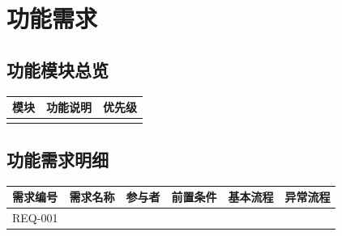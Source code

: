 \section{功能需求}

\subsection{功能模块总览}

\begin{longtable}{|p{36mm}|p{88mm}|p{24mm}|}
\hline
\textbf{模块} & \textbf{功能说明} & \textbf{优先级} \\
\hline
 &  &  \\
\hline
\end{longtable}

\subsection{功能需求明细}

\begin{longtable}{|p{18mm}|p{24mm}|p{22mm}|p{24mm}|p{32mm}|p{32mm}|}
\hline
\textbf{需求编号} & \textbf{需求名称} & \textbf{参与者} & \textbf{前置条件} & \textbf{基本流程} & \textbf{异常流程} \\
\hline
REQ-001 &  &  &  &  &  \\
\hline
\end{longtable}
